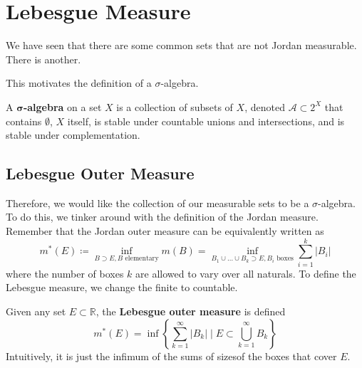 \section{Lebesgue Measure} 

  We have seen that there are some common sets that are not Jordan measurable. There is another. 

  \begin{example}
    
  \end{example}

  This motivates the definition of a $\sigma$-algebra. 

  \begin{definition}
    A \textbf{$\boldsymbol{\sigma}$-algebra} on a set $X$ is a collection  of subsets of $X$, denoted $\mathcal{A} \subset 2^X$ that contains $\emptyset$, $X$ itself, is stable under countable unions and intersections, and is stable under complementation. 
  \end{definition} 

\subsection{Lebesgue Outer Measure}

  Therefore, we would like the collection of our measurable sets to be a $\sigma$-algebra. To do this, we tinker around with the definition of the Jordan measure. Remember that the Jordan outer measure can be equivalently written as 
  \begin{equation}
    m^\ast (E) \coloneqq \inf_{B \supset E, B \text{ elementary}} m(B) = \inf_{B_1 \cup \ldots \cup B_k \supset E, B_i \text{ boxes}} \sum_{i=1}^k |B_i|
  \end{equation}
  where the number of boxes $k$ are allowed to vary over all naturals. To define the Lebesgue measure, we change the finite to countable. 

  \begin{definition}
    Given any set $E \subset \mathbb{R}$, the \textbf{Lebesgue outer measure} is defined 
    \begin{equation}
      m^\ast (E) = \inf  \left\{ \sum_{k=1}^\infty |B_k| \; \bigg| \; E \subset \bigcup_{k=1}^\infty B_k \right\} 
    \end{equation}
    Intuitively, it is just the infimum of the sums of sizesof the boxes that cover $E$.
  \end{definition} 

